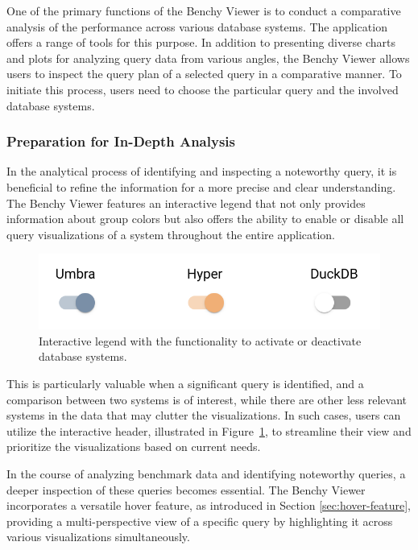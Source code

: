 One of the primary functions of the Benchy Viewer is to conduct a comparative analysis of the performance across various database systems. The application offers a range of tools for this purpose. In addition to presenting diverse charts and plots for analyzing query data from various angles, the Benchy Viewer allows users to inspect the query plan of a selected query in a comparative manner. To initiate this process, users need to choose the particular query and the involved database systems.

\subsubsection{Preparation for In-Depth Analysis}

In the analytical process of identifying and inspecting a noteworthy query, it is beneficial to refine the information for a more precise and clear understanding.\\
The Benchy Viewer features an interactive legend that not only provides information about group colors but also offers the ability to enable or disable all query visualizations of a system throughout the entire application.

\begin{figure}[h]
  \centering
  \includegraphics[width=0.4\linewidth]{figures/legend-activate-deactivate.png}
  \caption{Interactive legend with the functionality to activate or deactivate database systems.}
  \label{fig:legend-activate-deactivate}
\end{figure}

This is particularly valuable when a significant query is identified, and a comparison between two systems is of interest, while there are other less relevant systems in the data that may clutter the visualizations. In such cases, users can utilize the interactive header, illustrated in Figure~\ref{fig:legend-activate-deactivate}, to streamline their view and prioritize the visualizations based on current needs.

In the course of analyzing benchmark data and identifying noteworthy queries, a deeper inspection of these queries becomes essential. The Benchy Viewer incorporates a versatile hover feature, as introduced in Section \ref{sec:hover-feature}, providing a multi-perspective view of a specific query by highlighting it across various visualizations simultaneously.


